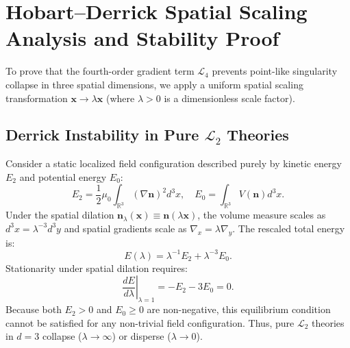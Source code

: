 \documentclass[11pt,a4paper]{article}
\begin{document}
	\section{Hobart--Derrick Spatial Scaling Analysis and Stability Proof}
	\label{sec:hobart_derrick}
	
	To prove that the fourth-order gradient term $\mathcal{L}_4$ prevents point-like singularity collapse in three spatial dimensions, we apply a uniform spatial scaling transformation $\mathbf{x} \to \lambda \mathbf{x}$ (where $\lambda > 0$ is a dimensionless scale factor).
	
	\subsection{Derrick Instability in Pure $\mathcal{L}_2$ Theories}
	Consider a static localized field configuration described purely by kinetic energy $E_2$ and potential energy $E_0$:
	\begin{equation}
		E_2 = \frac{1}{2} \mu_0 \int_{\mathbb{R}^3} (\nabla \mathbf{n})^2 d^3x, \quad E_0 = \int_{\mathbb{R}^3} V(\mathbf{n}) d^3x.
	\end{equation}
	Under the spatial dilation $\mathbf{n}_\lambda(\mathbf{x}) \equiv \mathbf{n}(\lambda \mathbf{x})$, the volume measure scales as $d^3x = \lambda^{-3} d^3y$ and spatial gradients scale as $\nabla_x = \lambda \nabla_y$. The rescaled total energy is:
	\begin{equation}
		E(\lambda) = \lambda^{-1} E_2 + \lambda^{-3} E_0.
		\label{eq:derrick_pure_scaling}
	\end{equation}
	Stationarity under spatial dilation requires:
	\begin{equation}
		\left. \frac{dE}{d\lambda} \right|_{\lambda=1} = -E_2 - 3 E_0 = 0.
	\end{equation}
	Because both $E_2 > 0$ and $E_0 \ge 0$ are non-negative, this equilibrium condition cannot be satisfied for any non-trivial field configuration. Thus, pure $\mathcal{L}_2$ theories in $d = 3$ collapse ($\lambda \to \infty$) or disperse ($\lambda \to 0$).
	
\end{document}
